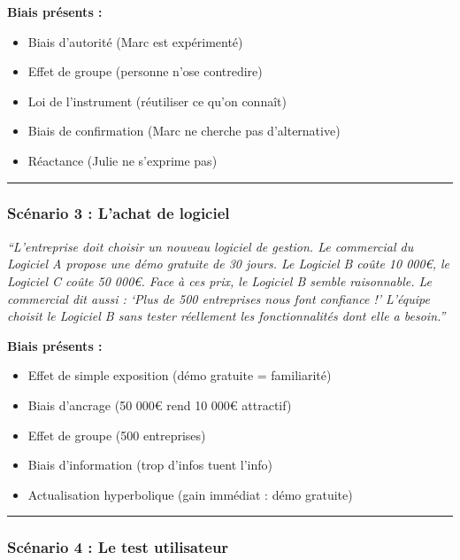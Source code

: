 \documentclass[
]{article}
\providecommand{\tightlist}{%
  \setlength{\itemsep}{0pt}\setlength{\parskip}{0pt}}
\begin{document}
\textbf{Biais présents :}

\begin{itemize}
\tightlist
\item
  Biais d'autorité (Marc est expérimenté)
\item
  Effet de groupe (personne n'ose contredire)
\item
  Loi de l'instrument (réutiliser ce qu'on connaît)
\item
  Biais de confirmation (Marc ne cherche pas d'alternative)
\item
  Réactance (Julie ne s'exprime pas)
\end{itemize}

\begin{center}\rule{0.5\linewidth}{0.5pt}\end{center}

\subsubsection{Scénario 3 : L'achat de
logiciel}\label{scuxe9nario-3-lachat-de-logiciel}

\emph{``L'entreprise doit choisir un nouveau logiciel de gestion. Le
commercial du Logiciel A propose une démo gratuite de 30 jours. Le
Logiciel B coûte 10 000€, le Logiciel C coûte 50 000€. Face à ces prix,
le Logiciel B semble raisonnable. Le commercial dit aussi : `Plus de 500
entreprises nous font confiance !' L'équipe choisit le Logiciel B sans
tester réellement les fonctionnalités dont elle a besoin.''}

\textbf{Biais présents :}

\begin{itemize}
\tightlist
\item
  Effet de simple exposition (démo gratuite = familiarité)
\item
  Biais d'ancrage (50 000€ rend 10 000€ attractif)
\item
  Effet de groupe (500 entreprises)
\item
  Biais d'information (trop d'infos tuent l'info)
\item
  Actualisation hyperbolique (gain immédiat : démo gratuite)
\end{itemize}

\begin{center}\rule{0.5\linewidth}{0.5pt}\end{center}

\subsubsection{Scénario 4 : Le test
utilisateur}\label{scuxe9nario-4-le-test-utilisateur}
\end{document}

